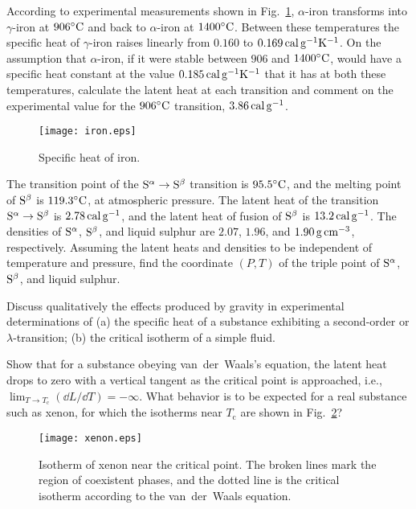 \bigskip{}
According to experimental measurements shown in Fig.~\ref{fig:iron},
$\alpha$-iron transforms into $\gamma$-iron at $906^\circ{\rm C}$
and back to $\alpha$-iron at $1400^\circ{\rm C}$.
Between these temperatures the specific heat of $\gamma$-iron
raises linearly from $0.160$ to $\rm 0.169\,cal\,g^{-1}K^{-1}$.
On the assumption that $\alpha$-iron, if it were stable between
$906$ and $1400^\circ{\rm C}$,
would have a specific heat constant at the value $\rm 0.185\,cal\,g^{-1}K^{-1}$
that it has at both these temperatures,
calculate the latent heat at each transition
and comment on the experimental value for the $906^\circ{\rm C}$ transition,
$\rm 3.86\,cal\,g^{-1}$.

\begin{figure}[hb]
\hfil\texttt{[image: iron.eps]}\hfil
\caption{Specific heat of iron.}\label{fig:iron}
\end{figure}

\bigskip{}
The transition point of the
$\rm S^\alpha \rightarrow S^\beta$
transition is $95.5^\circ{\rm C}$,
and the melting point of $\rm S^\beta$ is $119.3^\circ{\rm C}$,
at atmospheric pressure.
The latent heat of the transition $\rm S^\alpha\rightarrow S^\beta$
is $\rm 2.78\,cal\,g^{-1}$,
and the latent heat of fusion of $\rm S^\beta$ is $\rm 13.2\,cal\,g^{-1}$.
The densities of $\rm S^\alpha$, $\rm S^\beta$, and liquid sulphur
are $2.07$, $1.96$, and $\rm 1.90\,g\,cm^{-3}$, respectively.
Assuming the latent heats and densities to be independent of temperature
and pressure, find the coordinate $(P, T)$ of the triple point of
$\rm S^\alpha$, $\rm S^\beta$, and liquid sulphur.

\bigskip{}
Discuss qualitatively the effects produced by gravity
in experimental determinations of
(a) the specific heat of a substance exhibiting a second-order
or $\lambda$-transition;
(b) the critical isotherm of a simple fluid.

\bigskip{}
Show that for a substance obeying van~der~Waals's equation,
the latent heat drops to zero with a vertical tangent
as the critical point is approached,
i.e., $\lim_{T\rightarrow T_\text{c}} (\dd L/\dd T) = -\infty$.
What behavior is to be expected for a real substance such as xenon,
for which the isotherms near $T_\text{c}$ are shown in Fig.~\ref{fig:xenon}?

\begin{figure}[hb]
\hfil\texttt{[image: xenon.eps]}\hfil
\caption{Isotherm of xenon near the critical point.
The broken lines mark the region of coexistent phases,
and the dotted line is the critical isotherm according to
the van~der~Waals equation.}\label{fig:xenon}
\end{figure}

